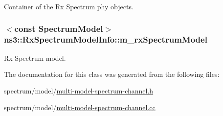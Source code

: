 Container of the Rx Spectrum phy objects. 

\subsubsection[{\texorpdfstring{m\+\_\+rx\+Spectrum\+Model}{m_rxSpectrumModel}}]{$<$const {\bf Spectrum\+Model}$>$ ns3\+::\+Rx\+Spectrum\+Model\+Info\+::m\+\_\+rx\+Spectrum\+Model}\hypertarget{classns3_1_1RxSpectrumModelInfo_aead459b994759aa8107e6a22fceeb722}{}\label{classns3_1_1RxSpectrumModelInfo_aead459b994759aa8107e6a22fceeb722}


Rx Spectrum model. 



The documentation for this class was generated from the following files\+:\begin{DoxyCompactItemize}
\item 
spectrum/model/\hyperlink{multi-model-spectrum-channel_8h}{multi-\/model-\/spectrum-\/channel.\+h}\item 
spectrum/model/\hyperlink{multi-model-spectrum-channel_8cc}{multi-\/model-\/spectrum-\/channel.\+cc}\end{DoxyCompactItemize}
